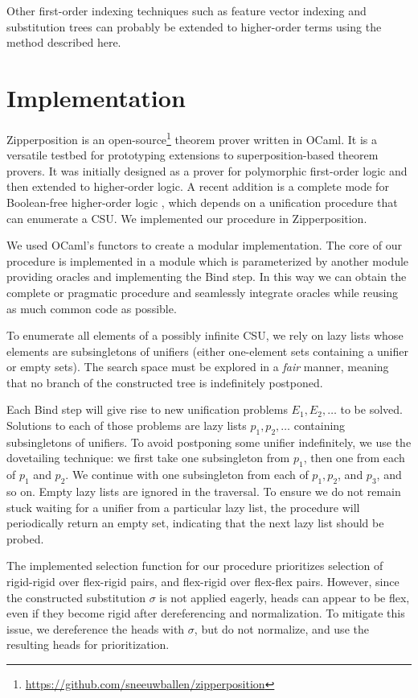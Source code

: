 Other first-order indexing techniques such as feature vector indexing and substitution trees
can probably be extended to higher-order terms using the method described here.
\pagebreak[2]

\section{Implementation}
\label{sec:unif:implementation}
Zipperposition \cite{sc-15-simon-phd, sc-supind-17} is an
open-source\footnote{\url{https://github.com/sneeuwballen/zipperposition}}
theorem prover written in OCaml.
It is a versatile testbed for prototyping extensions to
superposition-based theorem provers.
It was initially
designed as a prover for polymorphic first-order logic
and then extended to higher-order logic.
A recent addition is a complete mode for
Boolean-free higher-order logic \cite{bbtvw-21-sup-lam},
which depends on a unification procedure that can enumerate a CSU. 
We implemented our procedure in Zipperposition.

We used OCaml's functors to create a modular implementation. The core of our
procedure is implemented in a module which is parameterized by another module
providing oracles and implementing the \textsf{Bind} step. In this way we can
obtain the complete or pragmatic procedure and seamlessly integrate
oracles while reusing as much common code as possible.

To enumerate all elements of a possibly infinite CSU, we rely on lazy lists whose
elements are subsingletons of unifiers (either one-element sets containing a unifier
or empty sets). The search space must be explored in a {\em fair} manner,
meaning that no branch of the constructed tree is indefinitely postponed. 

Each {\sf Bind} step will give rise to new unification problems $E_1, E_2,
\ldots$ to be solved. Solutions to each of those problems are lazy lists $p_1,
p_2, \ldots$ containing subsingletons of unifiers. To avoid postponing some
unifier indefinitely, we use the dovetailing technique: we first take one
subsingleton from $p_1$, then one from each of $p_1$ and $p_2$. We continue with
one subsingleton from each of $p_1,p_2$, and $p_3$, and so on. Empty lazy lists are
ignored in the traversal. To ensure we do not remain stuck waiting for a unifier
from a particular lazy list, the procedure will periodically return an empty
set, indicating that the next lazy list should be probed. 

The implemented selection function for our procedure prioritizes selection of
rigid-rigid over flex-rigid pairs, and flex-rigid over flex-flex pairs. However,
since the constructed substitution $\sigma$ is not applied eagerly, heads can
appear to be flex, even if they become rigid after dereferencing and
normalization. To mitigate this issue, we
dereference the heads with $\sigma$, but do not normalize, and use the resulting
heads for prioritization.


